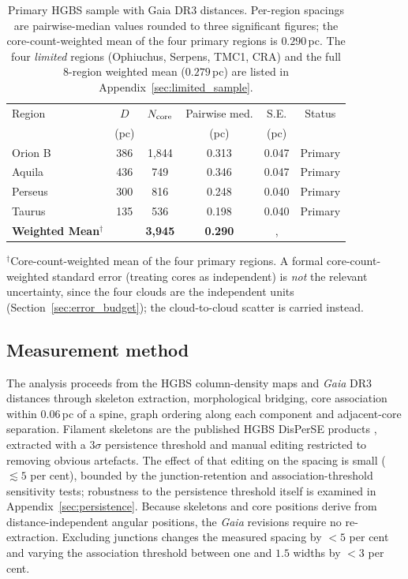 \documentclass[usenatbib,twoside,twocolumn]{mnras}
\begin{document}
\begin{table}
\caption{Primary HGBS sample with Gaia DR3 distances. Per-region spacings are pairwise-median values rounded to three significant figures; the core-count-weighted mean of the four primary regions is $0.290$\,pc. The four \emph{limited} regions (Ophiuchus, Serpens, TMC1, CRA) and the full 8-region weighted mean ($0.279$\,pc) are listed in Appendix~\ref{sec:limited_sample}.}
\label{tab:sample}
\footnotesize
\setlength{\tabcolsep}{3pt}
\begin{tabular}{lccccc}
\toprule
Region & $D$ & $N_{\rm core}$ & Pairwise med. & S.E. & Status \\
       & (pc) &  & (pc) & (pc) &  \\
\midrule
Orion B  & 386 & 1,844 & 0.313 & 0.047 & Primary \\
Aquila   & 436 & 749   & 0.346 & 0.047 & Primary \\
Perseus  & 300 & 816   & 0.248 & 0.040 & Primary \\
Taurus   & 135 & 536   & 0.198 & 0.040 & Primary \\
\midrule
\textbf{Weighted Mean}$^\dagger$ &  & \textbf{3,945} & \textbf{0.290} &, &  \\
\bottomrule
\end{tabular}
\par\vspace{2pt}
\footnotesize $^\dagger$Core-count-weighted mean of the four primary regions. A formal core-count-weighted standard error (treating cores as independent) is \emph{not} the relevant uncertainty, since the four clouds are the independent units (Section~\ref{sec:error_budget}); the cloud-to-cloud scatter is carried instead.
\end{table}

\subsection{Measurement method}
\label{sec:methodology}

The analysis proceeds from the HGBS column-density maps and \textit{Gaia} DR3 distances through skeleton extraction, morphological bridging, core association within $0.06$\,pc of a spine, graph ordering along each component and adjacent-core separation. Filament skeletons are the published HGBS DisPerSE products \citep{Sousbie2011,Arzoumanian2011}, extracted with a $3\sigma$ persistence threshold and manual editing restricted to removing obvious artefacts. The effect of that editing on the spacing is small ($\lesssim5$ per cent), bounded by the junction-retention and association-threshold sensitivity tests; robustness to the persistence threshold itself is examined in Appendix~\ref{sec:persistence}. Because skeletons and core positions derive from distance-independent angular positions, the \textit{Gaia} revisions require no re-extraction. Excluding junctions changes the measured spacing by $<5$ per cent and varying the association threshold between one and $1.5$ widths by $<3$ per cent.
\end{document}
